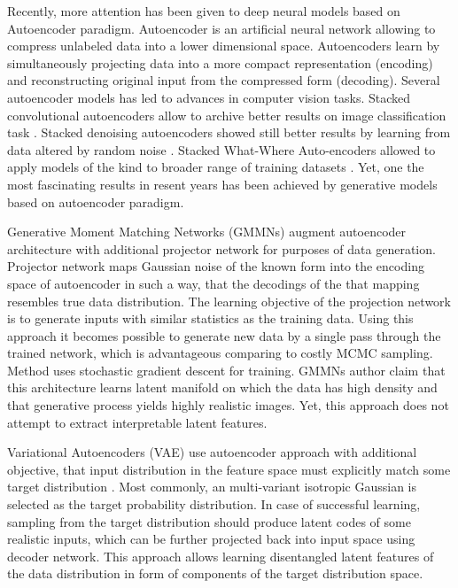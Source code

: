 Recently, more attention has been given to deep neural models based on Autoencoder paradigm.
Autoencoder is an artificial neural network allowing to compress unlabeled data into a lower dimensional space.
Autoencoders learn by simultaneously projecting data into a more compact representation (encoding) and reconstructing original input from the compressed form (decoding).
Several autoencoder models has led to advances in computer vision tasks.
Stacked convolutional autoencoders allow to archive better results on image classification task \cite{Masci2011}.
Stacked denoising autoencoders showed still better results by learning from data altered by random noise  \cite{Vincent2010}.
Stacked What-Where Auto-encoders allowed to apply models of the kind to broader range of training datasets \cite{Zhao2015}.
Yet, one the most fascinating results in resent years has been achieved by generative models based on autoencoder paradigm.

Generative Moment Matching Networks (GMMNs) \cite{Li2015, Ren2016} augment autoencoder architecture with additional projector network for purposes of data generation.
Projector network maps Gaussian noise of the known form into the encoding space of autoencoder in such a way, that the decodings of the that mapping resembles true data distribution.
The learning objective of the projection network is to generate inputs with similar statistics as the training data.
Using this approach it becomes possible to generate new data by a single pass through the trained network, which is advantageous comparing to costly MCMC sampling.
Method uses stochastic gradient descent for training.
GMMNs author claim that this architecture learns latent manifold on which the data has high density and that generative process yields highly realistic images.
Yet, this approach does not attempt to extract interpretable latent features.

Variational Autoencoders (VAE) use autoencoder approach with additional objective, that input distribution in the feature space must explicitly match some target distribution \cite{Kingma2013, Doersch2016}.
Most commonly, an multi-variant isotropic Gaussian is selected as the target probability distribution.
In case of successful learning, sampling from the target distribution should produce latent codes of some realistic inputs, which can be further projected back into input space using decoder network.
This approach allows learning disentangled latent features of the data distribution in form of components of the target distribution space.

